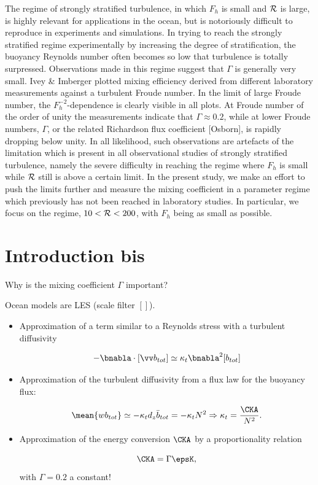 The regime of strongly stratified turbulence, in which $ F_h $ is small and $
{\cal{R}} $ is large, is highly relevant for applications in the
ocean\cite[]{RileyDeBruynKops2003, Lindborg2006}, but is notoriously difficult
to reproduce in experiments and simulations. In trying to reach the strongly
stratified regime experimentally by increasing the degree of stratification,
the buoyancy Reynolds number often becomes so low that turbulence is totally
surpressed. Observations made in this regime suggest that $ \Gamma $ is
generally very small. Ivey \& Imberger \cite{IveyImberger1991} plotted mixing
efficiency derived from different laboratory measurements
\cite{Stillinger1983, Itsweire1986, Rohr1988, Lienhard1990} against a turbulent Froude
number. In the limit of large Froude number, the $ F_h^{-2} $-dependence is
clearly visible in all plots. At Froude number of the order of unity the
measurements indicate that $ \Gamma \approx 0.2 $, while at lower Froude
numbers, $ \Gamma $, or the related Richardson flux coefficient [Osborn], is
rapidly dropping below unity. In all likelihood, such observations are
artefacts of the limitation which is present in all observational studies of
strongly stratified turbulence, namely the severe difficulty in reaching the
regime where $ F_h $ is small while $ {\cal{R}} $ still is above a certain
limit. In the present study, we make an effort to push the limits further and
measure the mixing coefficient in a parameter regime which previously has not
been reached in laboratory studies. In particular, we focus on the regime, $ 10
< {\cal R} < 200 $, with $ F_h $ being as small as possible.


\section{Introduction bis}

Why is the mixing coefficient $\Gamma$ important?

Ocean models are LES (scale filter $[]$).

\begin{itemize}

\item Approximation of a term similar to a Reynolds stress with a turbulent diffusivity

$$- \bnabla \cdot [\vv b_{tot}] \simeq \kappa_t \bnabla^2 [b_{tot}] $$

\item Approximation of the turbulent diffusivity from a flux law for the buoyancy flux:

$$\mean{w b_{tot}} \simeq - \kappa_t d_z \bar b_{tot} = - \kappa_t N^2  \Rightarrow \kappa_t = \frac{\CKA}{N^2}.$$

\item  Approximation of the energy conversion $\CKA$ by a proportionality relation

$$ \CKA = \Gamma \epsK, $$
with $\Gamma = 0.2$ a constant!
\end{itemize}


